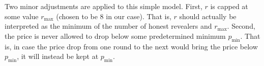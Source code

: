 Two minor adjustments are applied to this simple model. First, $r$ is capped at some value $r_{\text{max}}$ (chosen to be 8 in our case). That is, $r$ should actually be interpreted as the minimum of the number of honest revealers and $r_{\text{max}}$. Second, the price is never allowed to drop below some predetermined minimum $p_{\text{min}}$. That is, in case the price drop from one round to the next would bring the price below $p_{\text{min}}$, it will instead be kept at $p_{\text{min}}$. 

